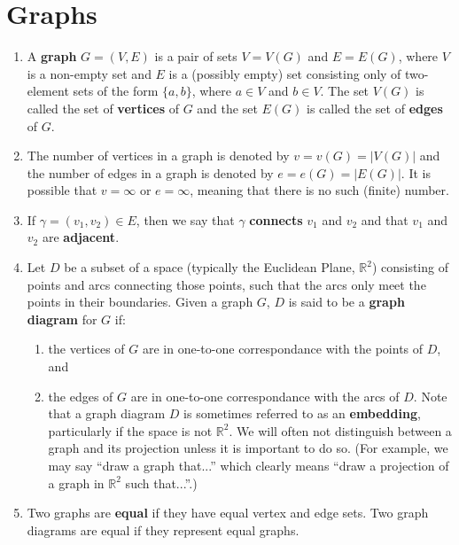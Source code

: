 \section{Graphs}\label{sec:graphs}

\begin{definition}
\begin{enumerate}
    \item \label{def:graph} A \textbf{graph} $G=(V, E)$ is a pair of sets $V=V(G)$ and $E=E(G)$, where $V$ is a non-empty set and $E$ is a (possibly empty) set consisting only of two-element sets of the form $\{a, b\}$, where $a \in V$ and $b \in V$.  The set $V(G)$ is called the set of \textbf{vertices} of $G$ and the set $E(G)$ is called the set of \textbf{edges} of $G$.
    \item The number of vertices in a graph is denoted by $v=v(G)=|V(G)|$ and the number of edges in a graph is denoted by $e=e(G)=|E(G)|$.  It is possible that $v=\infty$ or $e=\infty$, meaning that there is no such (finite) number.
    \item If $\gamma=(v_1, v_2)\in E$, then we say that $\gamma$ \textbf{connects} $v_1$ and $v_2$ and that $v_1$ and $v_2$ are \textbf{adjacent}.
    \item \label{def:graph_diagram} Let $D$ be a subset of a space (typically the Euclidean Plane, $\mathbb{R}^2$) consisting of points and arcs connecting those points, such that the arcs only meet the points in their boundaries.  Given a graph $G$, $D$ is said to be a \textbf{graph diagram} for $G$ if:
    \begin{enumerate}
        \item the vertices of $G$ are in one-to-one correspondance with the points of $D$, and
        \item the edges of $G$ are in one-to-one correspondance with the arcs of $D$.
    Note that a graph diagram $D$ is sometimes referred to as an \textbf{embedding}, particularly if the space is not $\mathbb{R}^2$.  We will often not distinguish between a graph and its projection unless it is important to do so. (For example, we may say ``draw a graph that...'' which clearly means ``draw a projection of a graph in $\mathbb{R}^2$ such that...''.)
    \end{enumerate}

    \item Two graphs are \textbf{equal} if they have equal vertex and edge sets.  Two graph diagrams are equal if they represent equal graphs.
\end{enumerate}
\end{definition}

